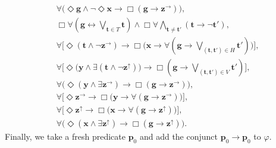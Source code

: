 \documentclass[10pt,a4paper]{amsart}
\theoremstyle{plain}
\theoremstyle{definition}
\newcommand{\bbvarup}{\Zvar^\uparrow}
\newcommand{\bbvarright}{\Zvar^\to}
\newcommand{\fform}[1]{\boldsymbol{#1}}
\newcommand{\pvar}{\fform{p}}
\newcommand{\gvar}{\fform{g}}
\newcommand{\tvar}{\fform{t}}
\newcommand{\xvar}{\fform{x}}
\newcommand{\yvar}{\fform{y}}
\newcommand{\Zvar}{\fform{z}}
\newcommand{\Bv}{\forall}
\newcommand{\Bh}{\Box}
\newcommand{\Dv}{\exists}
\newcommand{\Dh}{\Diamond}
\begin{document}
	\begin{align*}
		&\Bv \bigl(\Dh \gvar \wedge \neg \Dh \xvar \rightarrow \Bh (\gvar \rightarrow \bbvarright)\bigr),\\
		& \Bh\Bv (\gvar \leftrightarrow \bigvee_{\tvar\in T}\tvar) \land
		    \Bh\Bv \bigwedge_{\tvar\not=\tvar'}(\tvar \rightarrow \neg \tvar'),\\
		&\Bv \bigl[\Dh (\tvar \wedge \neg \bbvarright) \rightarrow \Bh \bigl(\xvar\rightarrow \Bv (\gvar \rightarrow \bigvee_{(\tvar,\tvar')\in H} \tvar')\bigr)\bigr],\\
		&
		\Bv \bigl[\Dh \bigl(\yvar \wedge \Dv (\tvar\wedge \neg \bbvarup)\bigr) \rightarrow \Bh (\gvar \rightarrow \bigvee_{(\tvar,\tvar')\in V} \tvar')\bigr],
		\\
		&\Bv \bigl(\Dh (\yvar \wedge \Dv \Zvar^{\rightarrow}) \rightarrow \Bh (\gvar \rightarrow \bbvarright)\bigr),\\
		&\Bv \bigl[\Dh\bbvarright \rightarrow \Bh \bigl(\yvar \rightarrow \Bv (\gvar \rightarrow \bbvarright)\bigr)\bigr],\\
		& \Bv\bigl[\Dh\bbvarup\to\Bh\bigl(\xvar\to\Bv(\gvar\to\bbvarup)\bigr)\bigr],\\
		& \Bv\bigl(\Dh(\xvar\land\Dv\bbvarup)\to\Bh(\gvar\to\bbvarup)\bigr).
	\end{align*}
	Finally, we take a fresh predicate $\pvar_0$ and add the conjunct $\pvar_0\to\pvar_0$ to $\varphi$.
	
	
	
\end{document}
